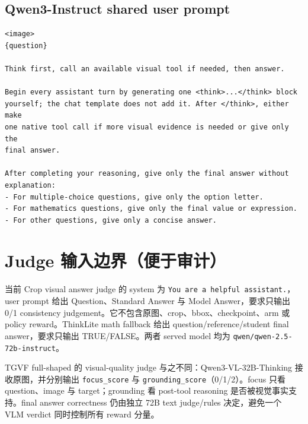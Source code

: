 \documentclass[UTF8,twocolumn,10pt,a4paper]{ctexart}
\newcommand{\TGVF}{\textsf{TGVF}}
\newcommand{\code}[1]{\texttt{#1}}
\begin{document}
\subsection{Qwen3-Instruct shared user prompt}

\begin{Verbatim}[breaklines=true,breakanywhere=true,fontsize=\scriptsize]
<image>
{question}

Think first, call an available visual tool if needed, then answer.

Begin every assistant turn by generating one <think>...</think> block
yourself; the chat template does not add it. After </think>, either make
one native tool call if more visual evidence is needed or give only the
final answer.

After completing your reasoning, give only the final answer without explanation:
- For multiple-choice questions, give only the option letter.
- For mathematics questions, give only the final value or expression.
- For other questions, give only a concise answer.
\end{Verbatim}

\section{Judge 输入边界（便于审计）}

当前 Crop visual answer judge 的 system 为 \code{You are a helpful assistant.}，user prompt 给出 Question、Standard Answer 与 Model Answer，要求只输出 0/1 consistency judgement。它不包含原图、crop、bbox、checkpoint、arm 或 policy reward。ThinkLite math fallback 给出 question/reference/student final answer，要求只输出 TRUE/FALSE。两者 served model 均为 \code{qwen/qwen-2.5-72b-instruct}。

\TGVF{} full-shaped 的 visual-quality judge 与之不同：Qwen3-VL-32B-Thinking 接收原图，并分别输出 \code{focus\_score} 与 \code{grounding\_score}（0/1/2）。focus 只看 question、image 与 target；grounding 看 post-tool reasoning 是否被视觉事实支持。final answer correctness 仍由独立 72B text judge/rules 决定，避免一个 VLM verdict 同时控制所有 reward 分量。
\end{document}
